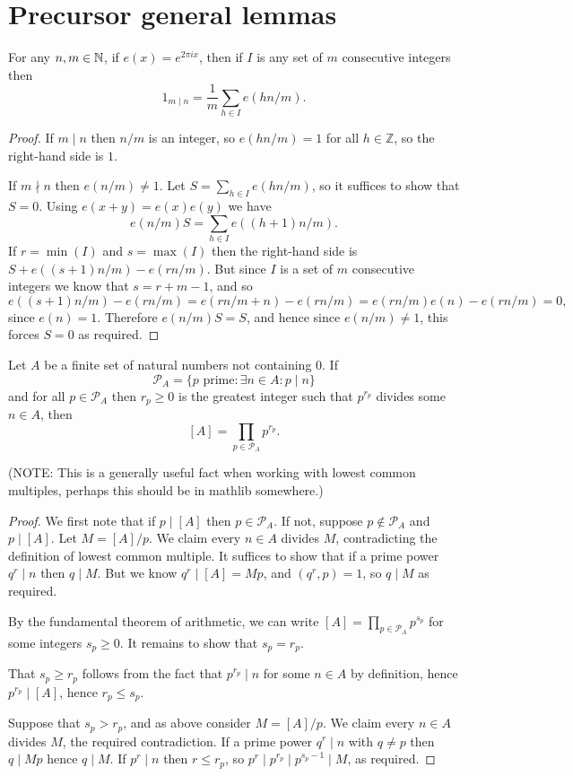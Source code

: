 \section{Precursor general lemmas}

\begin{lemma}\label{lem:orthogonality}
  \leanok
For any $n,m\in\mathbb{N}$, if $e(x) = e^{2\pi ix}$, then if $I$ is any set of $m$ consecutive integers then
\[1_{m\mid n}=\frac{1}{m}\sum_{h\in I}e(h n/m).\]
\end{lemma}
\begin{proof}
  \leanok
If $m\mid n$ then $n/m$ is an integer, so $e(hn/m)=1$ for all $h\in \mathbb{Z}$, so the right-hand side is $1$.

If $m\nmid n$ then $e(n/m)\neq 1$. Let $S=\sum_{h\in I}e(hn/m)$, so it suffices to show that $S=0$. Using $e(x+y)=e(x)e(y)$ we have
\[e(n/m)S = \sum_{h\in I}e((h+1)n/m).\]
If $r=\min(I)$ and $s=\max(I)$ then the right-hand side is $S + e((s+1)n/m)-e(rn/m)$. But since $I$ is a set of $m$ consecutive integers we know that $s=r+m-1$, and so
\[e((s+1)n/m)-e(rn/m) = e(rn/m+n)-e(rn/m)=e(rn/m)e(n)-e(rn/m)=0,\]
since $e(n)=1$. Therefore $e(n/m)S=S$, and hence since $e(n/m)\neq 1$, this forces $S=0$ as required.
\end{proof}

\begin{lemma}\label{lem:lcm_desc}
  \leanok
Let $A$ be a finite set of natural numbers not containing $0$. If
\[\mathcal{P}_A = \{ p \textrm{ prime}: \exists n\in A : p \mid n\}\]
and for all $p\in \mathcal{P}_A$ then $r_p\geq 0$ is the greatest integer such that $p^{r_p}$ divides some $n\in A$, then
\[[A]=\prod_{p\in\mathcal{P}_A}p^{r_p}.\]
\end{lemma}
(NOTE: This is a generally useful fact when working with lowest common multiples, perhaps this should be in mathlib somewhere.)
\begin{proof}
  \leanok
We first note that if $p\mid [A]$ then $p\in \mathcal{P}_A$. If not, suppose $p\not\in\mathcal{P}_A$ and $p\mid [A]$. Let $M=[A]/p$. We claim every $n\in A$ divides $M$, contradicting the definition of lowest common multiple. It suffices to show that if a prime power $q^r\mid n$ then $q\mid M$. But we know $q^r\mid [A]=Mp$, and $(q^r,p)=1$, so $q\mid M$ as required.

By the fundamental theorem of arithmetic, we can write $[A] = \prod_{p\in \mathcal{P}_A}p^{s_p}$ for some integers $s_p\geq 0$. It remains to show that $s_p=r_p$.

That $s_p\geq r_p$ follows from the fact that $p^{r_p}\mid n$ for some $n\in A$ by definition, hence $p^{r_p}\mid [A]$, hence $r_p\leq s_p$.

Suppose that $s_p>r_p$, and as above consider $M=[A]/p$. We claim every $n\in A$ divides $M$, the required contradiction. If a prime power $q^r\mid n$ with $q\neq p$ then $q\mid Mp$ hence $q\mid M$. If $p^r\mid n$ then $r\leq r_p$, so $p^r\mid p^{r_p}\mid p^{s_p-1}\mid M$, as required.
\end{proof}

